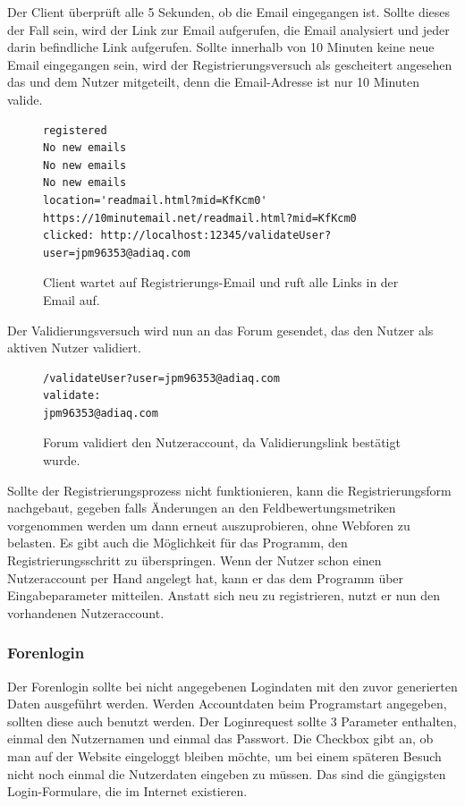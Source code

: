 Der Client überprüft alle 5 Sekunden, ob die Email eingegangen ist. Sollte dieses der Fall sein, wird der Link zur Email aufgerufen, die Email analysiert und jeder darin befindliche Link aufgerufen. Sollte innerhalb von 10 Minuten keine neue Email eingegangen sein, wird der Registrierungsversuch als gescheitert angesehen das und dem Nutzer mitgeteilt, denn die Email-Adresse ist nur 10 Minuten valide.

\begin{figure}[ht]
\begin{lstlisting}[language=HTML5]
registered
No new emails
No new emails
No new emails
location='readmail.html?mid=KfKcm0'
https://10minutemail.net/readmail.html?mid=KfKcm0
clicked: http://localhost:12345/validateUser?user=jpm96353@adiaq.com
\end{lstlisting}
\caption{Client wartet auf Registrierungs-Email und ruft alle Links in der Email auf.}
\end{figure}

Der Validierungsversuch wird nun an das Forum gesendet, das den Nutzer als aktiven Nutzer validiert.

\begin{figure}[ht]
\begin{lstlisting}[language=HTML5]
/validateUser?user=jpm96353@adiaq.com
validate:
jpm96353@adiaq.com
\end{lstlisting}
\caption{Forum validiert den Nutzeraccount, da Validierungslink bestätigt wurde.}
\end{figure}

Sollte der Registrierungsprozess nicht funktionieren, kann die Registrierungsform nachgebaut, gegeben falls Änderungen an den Feldbewertungsmetriken vorgenommen werden um dann erneut auszuprobieren, ohne Webforen zu belasten. Es gibt auch die Möglichkeit für das Programm, den Registrierungsschritt zu überspringen. Wenn der Nutzer schon einen Nutzeraccount per Hand angelegt hat, kann er das dem Programm über Eingabeparameter mitteilen. Anstatt sich neu zu registrieren, nutzt er nun den vorhandenen Nutzeraccount.

\subsubsection{Forenlogin}
Der Forenlogin sollte bei nicht angegebenen Logindaten mit den zuvor generierten Daten ausgeführt werden. Werden Accountdaten beim Programstart angegeben, sollten diese auch benutzt werden. Der Loginrequest sollte 3 Parameter enthalten, einmal den Nutzernamen und einmal das Passwort. Die Checkbox gibt an, ob man auf der Website eingeloggt bleiben möchte, um bei einem späteren Besuch nicht noch einmal die Nutzerdaten eingeben zu müssen. Das sind die gängigsten Login-Formulare, die im Internet existieren.

